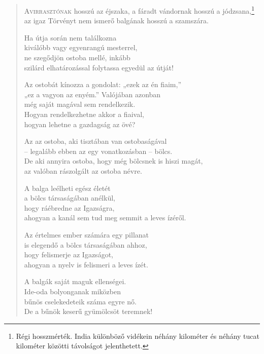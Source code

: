 
\begin{verse}

{\par%
\lettrine{A}{virrasztónak} {\LettrineTextFont hosszú az éjszaka,}\newline
a fáradt vándornak hosszú a jódzsana,\footnote{Régi hosszmérték. India különböző vidékein néhány kilométer és néhány tucat kilométer közötti távolságot jelenthetett.}\newline
az igaz Törvényt nem ismerő\verselinebreak
balgának hosszú a szamszára.
\par}

 Ha útja során nem találkozna\\
kiválóbb vagy egyenrangú mesterrel,\\
ne szegődjön ostoba mellé, inkább\\
szilárd elhatározással folytassa egyedül az útját!

 Az ostobát kínozza a gondolat: „ezek az én fiaim,”\\
„ez a vagyon az enyém.” Valójában azonban\\
még saját magával sem rendelkezik.\\
Hogyan rendelkezhetne akkor a fiaival,\\
hogyan lehetne a gazdagság az övé?

 Az az ostoba, aki tisztában van ostobaságával\\
– legalább ebben az egy vonatkozásban – bölcs.\\
De aki annyira ostoba, hogy még bölcsnek is hiszi magát,\\
az valóban rászolgált az ostoba névre.

 A balga leélheti egész életét\\
a bölcs társaságában anélkül,\\
hogy ráébredne az Igazságra,\\
ahogyan a kanál sem tud meg semmit a leves ízéről.

 Az értelmes ember számára egy pillanat\\
is elegendő a bölcs társaságában ahhoz,\\
hogy felismerje az Igazságot,\\
ahogyan a nyelv is felismeri a leves ízét.

 A balgák saját maguk ellenségei.\\
Ide-oda bolyonganak miközben\\
bűnös cselekedeteik száma egyre nő.\\
De a bűnök keserű gyümölcsöt teremnek!


\end{verse}
